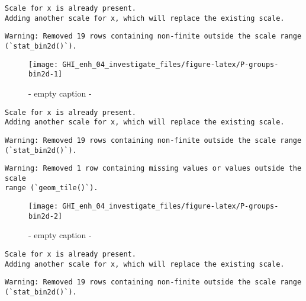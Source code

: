 \documentclass[
  10pt,
  a4paper,oneside]{article}
\begin{document}
\begin{verbatim}
Scale for x is already present.
Adding another scale for x, which will replace the existing scale.
\end{verbatim}

\begin{verbatim}
Warning: Removed 19 rows containing non-finite outside the scale range
(`stat_bin2d()`).
\end{verbatim}

\begin{figure}[H]

{\centering \texttt{[image: GHI\_enh\_04\_investigate\_files/figure-latex/P-groups-bin2d-1]} 

}

\caption{ - empty caption - }\label{fig:P-groups-bin2d-1}
\end{figure}

\begin{verbatim}
Scale for x is already present.
Adding another scale for x, which will replace the existing scale.
\end{verbatim}

\begin{verbatim}
Warning: Removed 19 rows containing non-finite outside the scale range
(`stat_bin2d()`).
\end{verbatim}

\begin{verbatim}
Warning: Removed 1 row containing missing values or values outside the scale
range (`geom_tile()`).
\end{verbatim}

\begin{figure}[H]

{\centering \texttt{[image: GHI\_enh\_04\_investigate\_files/figure-latex/P-groups-bin2d-2]} 

}

\caption{ - empty caption - }\label{fig:P-groups-bin2d-2}
\end{figure}

\begin{verbatim}
Scale for x is already present.
Adding another scale for x, which will replace the existing scale.
\end{verbatim}

\begin{verbatim}
Warning: Removed 19 rows containing non-finite outside the scale range
(`stat_bin2d()`).
\end{verbatim}
\end{document}
